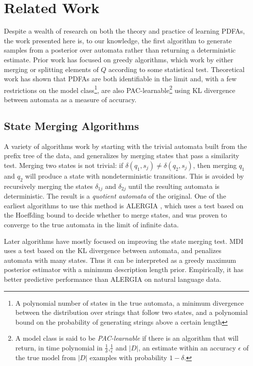 \section{Related Work}

Despite a wealth of research on both the theory and practice of learning PDFAs, the work presented here is, to our knowledge, the first algorithm to generate samples from a posterior over automata rather than returning a deterministic estimate.  Prior work has focused on greedy algorithms, which work by either merging or splitting elements of $Q$ according to some statistical test.  Theoretical work has shown that PDFAs are both identifiable in the limit and, with a few restrictions on the model class\footnote{A polynomial number of states in the true automata, a minimum divergence between the distribution over strings that follow two states, and a polynomial bound on the probability of generating strings above a certain length}, are also PAC-learnable\footnote{A model class is said to be {\em PAC-learnable} if there is an algorithm that will return, in time polynomial in $\frac{1}{\delta}$,$\frac{1}{\epsilon}$ and $|D|$, an estimate within an accuracy $\epsilon$ of the true model from $|D|$ examples with probability $1-\delta$.} using KL divergence between automata as a measure of accuracy.

\subsection{State Merging Algorithms}
A variety of algorithms work by starting with the trivial automata built from the prefix tree of the data, and generalizes by merging states that pass a similarity test.  Merging two states is not trivial: if $\delta(q_1,s_j) \ne \delta(q_2,s_j)$, then merging $q_1$ and $q_2$ will produce a state with nondeterministic transitions.  This is avoided by recursively merging the states $\delta_{1j}$ and $\delta_{2j}$ until the resulting automata is deterministic.  The result is a {\em quotient automata} of the original.  One of the earliest algorithms to use this method is ALERGIA \cite{Carrasco1994}, which uses a test based on the Hoeffding bound to decide whether to merge states, and was proven to converge to the true automata in the limit of infinite data.

Later algorithms have mostly focused on improving the state merging test.  MDI uses a test based on the KL divergence between automata, and penalizes automata with many states.  Thus it can be interpreted as a greedy maximum posterior estimator with a minimum description length prior.  Empirically, it has better predictive performance than ALERGIA on natural language data.

